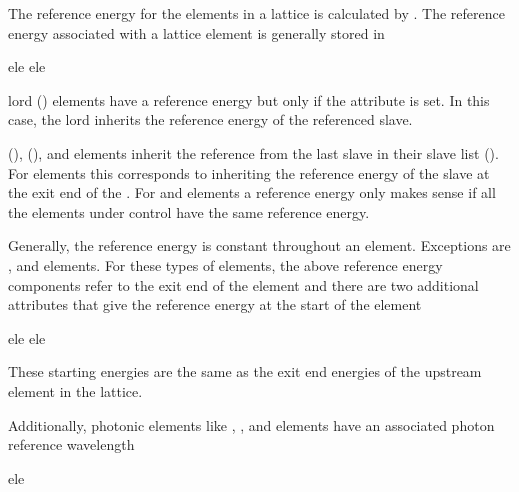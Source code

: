{{{{{{{
The reference energy for the elements in a lattice is calculated by
.
The reference energy associated with a lattice element is generally stored in
\begin{example}
  ele%
  ele%
\end{example}

 lord () elements have a
reference energy but only if the  attribute is set. In
this case, the  lord inherits the reference energy of
the referenced slave.

 (),  (), and
 elements inherit the reference from the last slave in
their slave list (). For  elements
this corresponds to inheriting the reference energy of the slave at
the exit end of the . For  and 
elements a reference energy only makes sense if all the elements under
control have the same reference energy.

Generally, the reference energy is constant throughout an
element. Exceptions are ,  and 
elements. For these types of elements, the above reference energy
components refer to the exit end of the element and there are two
additional attributes that give the reference energy at the start of
the element
\begin{example}
  ele%
  ele%
\end{example}
These starting energies are the same as the exit end energies of the upstream element in the lattice.

Additionally, photonic elements like , ,
 and  elements have an associated photon reference wavelength
\begin{example}
  ele%
\end{example}

}}}}}}}
